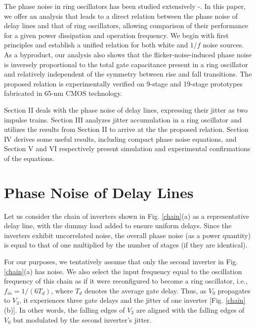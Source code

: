 The phase noise in ring oscillators has been studied extensively \cite{Mcneill}-\cite{Grozing}.
In this paper, we offer an analysis that leads to a direct relation between the phase noise of delay lines and that of ring oscillators, allowing comparison of
their performance for a given power dissipation and operation frequency. 
We begin with first principles and establish a unified relation for both white and $1/f$ noise sources.
As a byproduct, our analysis also shows that the flicker-noise-induced phase noise is inversely proportional to the total gate capacitance present in a ring oscillator
and relatively independent of the symmetry between rise and fall transitions.
The proposed relation is experimentally verified on 9-stage and 19-stage prototypes fabricated in 65-nm CMOS technology.




Section II deals with the phase noise of delay lines, expressing their jitter as two impulse trains. Section III analyzes jitter accumulation in a ring oscillator and
utilizes the results from Section II to arrive at the the proposed relation. Section IV derives some useful results, including compact phase noise equations,
and Section V and VI respectively present simulation and experimental confirmations of the equations.
 
 
\section{Phase Noise of Delay Lines}

Let us consider the chain of inverters shown in Fig. \ref{chain}(a) as a representative delay line, with the dummy load added to ensure uniform delays. Since the inverters
exhibit uncorrelated noise, the overall phase noise (as a power quantity) is equal to that of one multiplied by the number of stages (if they are identical). 


 
For our purposes, we tentatively assume that only the second inverter in Fig. \ref{chain}(a) has noise. We also select the input frequency equal to the oscillation
frequency of this chain as if it were reconfigured to become a ring oscillator, i.e., $f_{in}=1/(6 T_d)$, where $T_d$ denotes the average gate delay. 
Thus, as $V_0$ propagates to $V_3$, it experiences three gate delays and the jitter of one inverter [Fig. \ref{chain}(b)]. In other words, the falling edges of $V_3$ are
aligned with the falling edges of $V_0$ but modulated by the second inverter's jitter.
 
